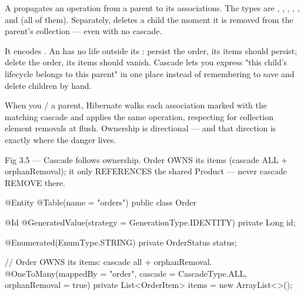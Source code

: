  A  propagates an  operation from a parent to its associations. The types are , , , , , and  (all of them). Separately,  deletes a child the moment it is removed from the parent's collection --- even with no  cascade.

 It encodes . An  has no life outside its : persist the order, its items should persist; delete the order, its items should vanish. Cascade lets you express "this child's lifecycle belongs to this parent" in one place instead of remembering to save and delete children by hand.

 When you  /  a parent, Hibernate walks each association marked with the matching cascade and applies the same operation, respecting  for collection element removals at flush. Ownership is directional --- and that direction is exactly where the danger lives.

\begin{wbfigure}{Fig 3.5 — Cascade follows ownership. Order OWNS its items (cascade ALL + orphanRemoval); it only REFERENCES the shared Product --- never cascade REMOVE there.}
\end{wbfigure}

\begin{javabox}
@Entity
@Table(name = "orders")
public class Order {
  @Id @GeneratedValue(strategy = GenerationType.IDENTITY)
  private Long id;

  @Enumerated(EnumType.STRING)
  private OrderStatus status;

  // Order OWNS its items: cascade all + orphanRemoval.
  @OneToMany(mappedBy = "order",
             cascade = CascadeType.ALL,
             orphanRemoval = true)
  private List<OrderItem> items = new ArrayList<>();
}
\end{javabox}

